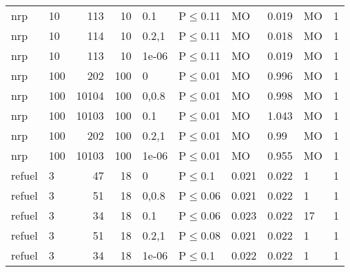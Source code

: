 \begin{longtable}{llrrllllll}
 nrp           & 10       &    	113 &  10 & 0.1   & P$\leq$0.11  & MO     & 0.019   & MO      & 1    \\
 nrp           & 10       &    	114 &  10 & 0.2,1 & P$\leq$0.11  & MO     & 0.018   & MO      & 1    \\
 nrp           & 10       &    	113 &  10 & 1e-06 & P$\leq$0.11  & MO     & 0.019   & MO      & 1    \\
 nrp           & 100      &    	202 & 100 & 0     & P$\leq$0.01  & MO     & 0.996   & MO      & 1    \\
 nrp           & 100      &  	10104 & 100 & 0,0.8 & P$\leq$0.01  & MO     & 0.998   & MO      & 1    \\
 nrp           & 100      &  	10103 & 100 & 0.1   & P$\leq$0.01  & MO     & 1.043   & MO      & 1    \\
 nrp           & 100      &    	202 & 100 & 0.2,1 & P$\leq$0.01  & MO     & 0.99    & MO      & 1    \\
 nrp           & 100      &  	10103 & 100 & 1e-06 & P$\leq$0.01  & MO     & 0.955   & MO      & 1    \\
 refuel        & 3        &     	47 &  18 & 0     & P$\leq$0.1   & 0.021  & 0.022   & 1       & 1    \\
 refuel        & 3        &     	51 &  18 & 0,0.8 & P$\leq$0.06  & 0.021  & 0.022   & 1       & 1    \\
 refuel        & 3        &     	34 &  18 & 0.1   & P$\leq$0.06  & 0.023  & 0.022   & 17      & 1    \\
 refuel        & 3        &     	51 &  18 & 0.2,1 & P$\leq$0.08  & 0.021  & 0.022   & 1       & 1    \\
 refuel        & 3        &     	34 &  18 & 1e-06 & P$\leq$0.1   & 0.022  & 0.022   & 1       & 1    \\
\bottomrule
\end{longtable}
